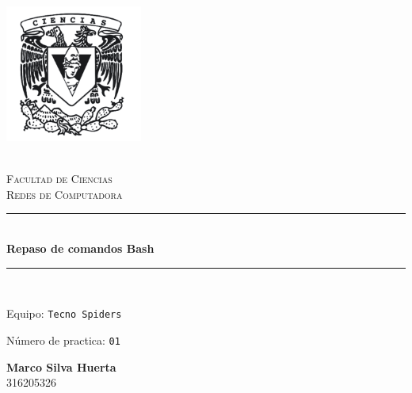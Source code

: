 \begin{titlepage}
    \center 
    \newcommand{\HRule}{\rule{\linewidth}{0.5mm}} 
    
    \includegraphics[width=4.5cm]{IMAGE/cienciasWhite.png}
    
    \quad \\[0.2cm]
    \textsc{\huge Facultad de Ciencias}\\[.6cm] 
    \textsc{\huge Redes de Computadora}\\[0.5cm]
    
    \makeatletter
        \HRule \\ [0.4cm]
            { \huge \bfseries Repaso de comandos Bash}\\
        \HRule \\ [0.4cm]
        
    \vspace{2mm}
    
    \begin{flushleft}
        \Large{Equipo:} \texttt{\Large Tecno Spiders}
    \end{flushleft}
    \begin{flushleft}
        \Large{Número de practica:} \texttt{\Large 01}\\[0.8cm]
    \end{flushleft}
    
    
    \vspace{5mm}
        
    \begin{minipage}{0.4\textwidth}
        \begin{flushright}
            \textbf{\large{Marco Silva Huerta}}\\
                316205326        
        \end{flushright}
    \end{minipage}
        

\end{titlepage}
